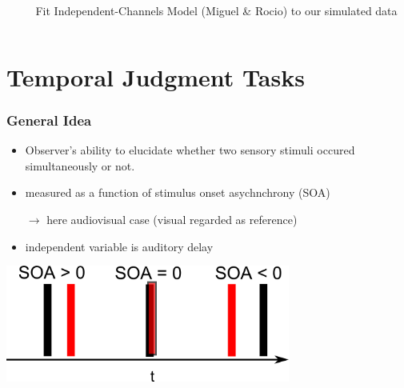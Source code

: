 \documentclass[xcolor={fixpdftex,hyperref,x11names},10pt,pdftex,hyperref={pdftex}]{beamer}
\begin{document}
\begin{frame}
\begin{columns}
\begin{column}{0.30\textwidth}
  \end{column}
  \begin{column}{0.70\textwidth}
  Fit Independent-Channels Model (Miguel \& Rocio) to our simulated data 
  \end{column}
  \end{columns}
\end{frame} 




\section{Temporal Judgment Tasks}
\label{sec:tjt}

\begin{frame}
    \frametitle{General Idea}

    \begin{itemize}
        \item Observer's ability to elucidate whether two sensory stimuli occured simultaneously or not.
        \item measured as a function of stimulus onset asychnchrony (SOA)
        \item[$\rightarrow$] here audiovisual case (visual regarded as reference)
        \item independent variable is auditory delay

    \end{itemize}
    
\begin{center}
    \includegraphics[width=0.7\textwidth]{figs/SOA-in-task.png}
\end{center}
    
\end{frame}
\end{document}
